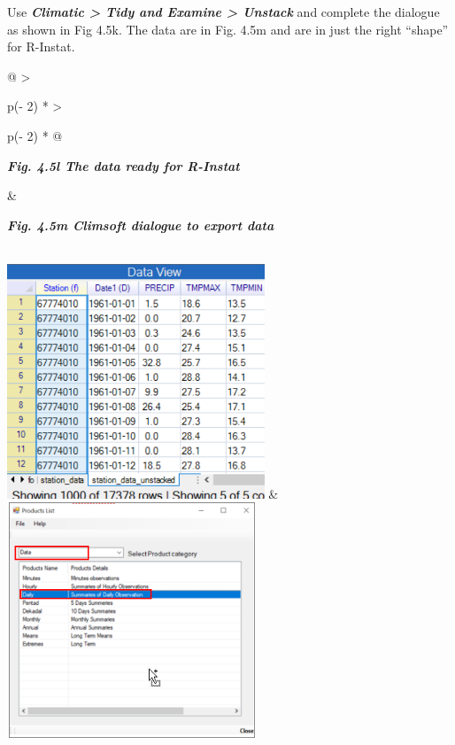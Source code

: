 \documentclass[
  letterpaper,
  DIV=11,
  numbers=noendperiod]{scrreprt}
\begin{document}
Use \textbf{\emph{Climatic \textgreater{} Tidy and Examine
\textgreater{} Unstack}} and complete the dialogue as shown in Fig 4.5k.
The data are in Fig. 4.5m and are in just the right ``shape'' for
R-Instat.

\begin{longtable}[]{@{}
  >{\raggedright\arraybackslash}p{(\columnwidth - 2\tabcolsep) * }
  >{\raggedright\arraybackslash}p{(\columnwidth - 2\tabcolsep) * }@{}}
\toprule\noalign{}
\begin{minipage}[b]{\linewidth}\raggedright
\textbf{\emph{Fig. 4.5l The data ready for R-Instat}}
\end{minipage} & \begin{minipage}[b]{\linewidth}\raggedright
\textbf{\emph{Fig. 4.5m Climsoft dialogue to export data}}
\end{minipage} \\
\midrule\noalign{}
\endhead
\bottomrule\noalign{}
\endlastfoot
\includegraphics[width=3.02697in,height=2.7565in]{figures/Fig4.5l.png} &
\includegraphics[width=2.93707in,height=2.77433in]{figures/Fig4.5m.png} \\
\end{longtable}
\end{document}
